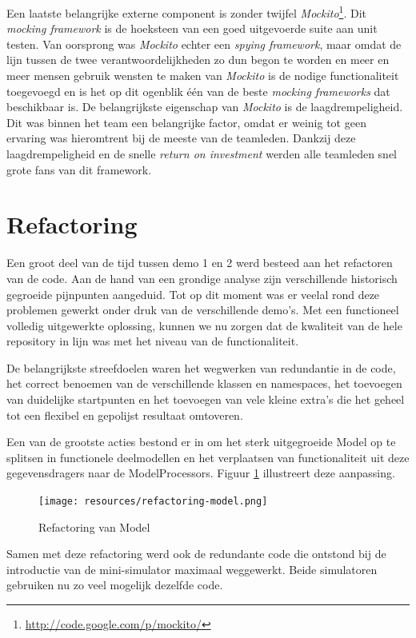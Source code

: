 \documentclass[12pt,a4paper]{report}
\begin{document}
Een laatste belangrijke externe component is zonder twijfel \emph{Mockito}\footnote{\url{http://code.google.com/p/mockito/}}. Dit \emph{mocking framework} is de hoeksteen van een goed uitgevoerde suite aan unit testen. Van oorsprong was \emph{Mockito} echter een \emph{spying framework}, maar omdat de lijn tussen de twee verantwoordelijkheden zo dun begon te worden en meer en meer mensen gebruik wensten te maken van \emph{Mockito} is de nodige functionaliteit toegevoegd en is het op dit ogenblik \'e\'en van de beste \emph{mocking frameworks} dat beschikbaar is. De belangrijkste eigenschap van \emph{Mockito} is de laagdrempeligheid. Dit was binnen het team een belangrijke factor, omdat er weinig tot geen ervaring was hieromtrent bij de meeste van de teamleden. Dankzij deze laagdrempeligheid en de snelle \emph{return on investment} werden alle teamleden snel grote fans van dit framework.

\section{Refactoring}

Een groot deel van de tijd tussen demo 1 en 2 werd besteed aan het refactoren van de code. Aan de hand van een grondige analyse zijn verschillende historisch gegroeide pijnpunten aangeduid. Tot op dit moment was er veelal rond deze problemen gewerkt onder druk van de verschillende demo's. Met een functioneel volledig uitgewerkte oplossing, kunnen we nu zorgen dat de kwaliteit van de hele repository in lijn was met het niveau van de functionaliteit.

De belangrijkste streefdoelen waren het wegwerken van redundantie in de code, het correct benoemen van de verschillende klassen en namespaces, het toevoegen van duidelijke startpunten en het toevoegen van vele kleine extra's die het geheel tot een flexibel en gepolijst resultaat omtoveren.

Een van de grootste acties bestond er in om het sterk uitgegroeide Model op te splitsen in functionele deelmodellen en het verplaatsen van functionaliteit uit deze gegevensdragers naar de ModelProcessors. Figuur \ref{uml:refactoring} illustreert deze aanpassing.

\begin{figure}[htbp]
  \centering
  \texttt{[image: resources/refactoring-model.png]}
  \caption{Refactoring van Model}
  \label{uml:refactoring}
\end{figure}

Samen met deze refactoring werd ook de redundante code die ontstond bij de introductie van de mini-simulator maximaal weggewerkt. Beide simulatoren gebruiken nu zo veel mogelijk dezelfde code.
\end{document}
